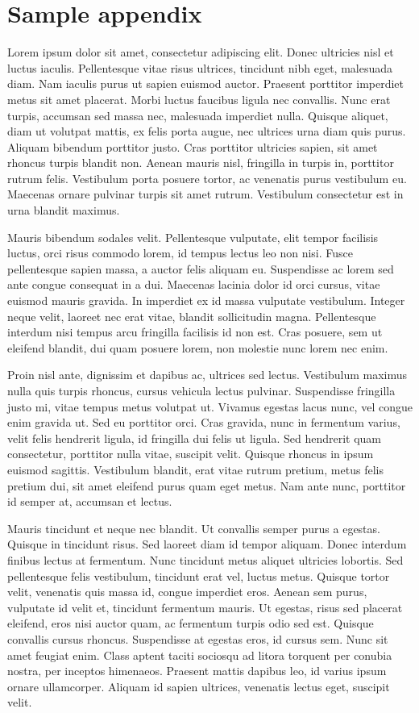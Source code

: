 \documentclass{lecnotes}
\begin{document}
	\chapter{Sample appendix}
	Lorem ipsum dolor sit amet, consectetur adipiscing elit. Donec ultricies nisl et luctus iaculis. Pellentesque vitae risus ultrices, tincidunt nibh eget, malesuada diam. Nam iaculis purus ut sapien euismod auctor. Praesent porttitor imperdiet metus sit amet placerat. Morbi luctus faucibus ligula nec convallis. Nunc erat turpis, accumsan sed massa nec, malesuada imperdiet nulla. Quisque aliquet, diam ut volutpat mattis, ex felis porta augue, nec ultrices urna diam quis purus. Aliquam bibendum porttitor justo. Cras porttitor ultricies sapien, sit amet rhoncus turpis blandit non. Aenean mauris nisl, fringilla in turpis in, porttitor rutrum felis. Vestibulum porta posuere tortor, ac venenatis purus vestibulum eu. Maecenas ornare pulvinar turpis sit amet rutrum. Vestibulum consectetur est in urna blandit maximus.
	
	Mauris bibendum sodales velit. Pellentesque vulputate, elit tempor facilisis luctus, orci risus commodo lorem, id tempus lectus leo non nisi. Fusce pellentesque sapien massa, a auctor felis aliquam eu. Suspendisse ac lorem sed ante congue consequat in a dui. Maecenas lacinia dolor id orci cursus, vitae euismod mauris gravida. In imperdiet ex id massa vulputate vestibulum. Integer neque velit, laoreet nec erat vitae, blandit sollicitudin magna. Pellentesque interdum nisi tempus arcu fringilla facilisis id non est. Cras posuere, sem ut eleifend blandit, dui quam posuere lorem, non molestie nunc lorem nec enim.
	
	Proin nisl ante, dignissim et dapibus ac, ultrices sed lectus. Vestibulum maximus nulla quis turpis rhoncus, cursus vehicula lectus pulvinar. Suspendisse fringilla justo mi, vitae tempus metus volutpat ut. Vivamus egestas lacus nunc, vel congue enim gravida ut. Sed eu porttitor orci. Cras gravida, nunc in fermentum varius, velit felis hendrerit ligula, id fringilla dui felis ut ligula. Sed hendrerit quam consectetur, porttitor nulla vitae, suscipit velit. Quisque rhoncus in ipsum euismod sagittis. Vestibulum blandit, erat vitae rutrum pretium, metus felis pretium dui, sit amet eleifend purus quam eget metus. Nam ante nunc, porttitor id semper at, accumsan et lectus.
	
	Mauris tincidunt et neque nec blandit. Ut convallis semper purus a egestas. Quisque in tincidunt risus. Sed laoreet diam id tempor aliquam. Donec interdum finibus lectus at fermentum. Nunc tincidunt metus aliquet ultricies lobortis. Sed pellentesque felis vestibulum, tincidunt erat vel, luctus metus. Quisque tortor velit, venenatis quis massa id, congue imperdiet eros. Aenean sem purus, vulputate id velit et, tincidunt fermentum mauris. Ut egestas, risus sed placerat eleifend, eros nisi auctor quam, ac fermentum turpis odio sed est. Quisque convallis cursus rhoncus. Suspendisse at egestas eros, id cursus sem. Nunc sit amet feugiat enim. Class aptent taciti sociosqu ad litora torquent per conubia nostra, per inceptos himenaeos. Praesent mattis dapibus leo, id varius ipsum ornare ullamcorper. Aliquam id sapien ultrices, venenatis lectus eget, suscipit velit.
	
\end{document}
